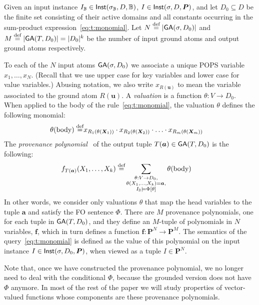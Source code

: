 
Given an input instance $I_\mathbb B \in \textsf{Inst}(\sigma_\mathbb B, D, \mathbb B)$,
$I \in \textsf{Inst}(\sigma, D, \bm P)$, and let $D_0 \subseteq D$ be the
finite set consisting of their active domains and all constants
occurring in the sum-product expression~\eqref{eq:t:monomial}.  Let
$N \stackrel{\text{def}}{=} |\textsf{GA}(\sigma, D_0)|$ and
$M \stackrel{\text{def}}{=} |\textsf{GA}(T,D_0)| = |D_0|^k$ be the number of input ground
atoms and output ground atoms respectively.

To each of the $N$ input atoms $\textsf{GA}(\sigma,D_0)$ we associate a unique POPS variable
$x_1, \ldots, x_N$. (Recall that we use upper case for key variables and
lower case for value variables.)
Abusing notation, we also write $x_{R(\bm u)}$ to mean the variable associated to the ground
atom $R(\bm u)$.
A {\em valuation} is a function $\theta : V \rightarrow D_0$.
When applied to the body of the rule~\eqref{eq:t:monomial}, the valuation $\theta$ defines the
following monomial:
%
\begin{align}
  \theta(\text{body}) \stackrel{\text{def}}{=} & x_{R_1(\theta(\bm X_1))}\cdot x_{R_2(\theta(\bm X_2))} \cdot \ldots \cdot x_{R_m(\theta(\bm X_m))} \label{eq:grounding:monomial}
\end{align}
%
The {\em provenance polynomial}~\cite{DBLP:conf/pods/GreenKT07} of the output tuple
$T(\bm a) \in \textsf{GA}(T,D_0)$ is the following:
%
\begin{align}
  f_{T(\bm a)}(X_1, \ldots, X_k) \stackrel{\text{def}}{=} &
  \sum_{\substack{\theta: V \rightarrow D_0, \\ \theta(X_1,\ldots,X_k)=\bm a, \\ I_\mathbb B \models
  \Phi[\theta]}} \theta(\text{body}) \label{eq:grounding:polynomial}
\end{align}
%
In other words, we consider only valuations $\theta$ that map the head
variables to the tuple $\bm a$ and satisfy the FO sentence $\Phi$.
There are $M$ provenance polynomials, one for each tuple in
$\textsf{GA}(T,D_0)$, and they define an $M$-tuple of polynomials in $N$
variables, $\bm f$, which in turn defines a function
$\bm f : \bm P^N \rightarrow \bm P^M$.  The semantics of the
query~\eqref{eq:t:monomial} is defined as the value of this polynomial
on the input instance $I \in \textsf{Inst}(\sigma, D_0, \bm P)$, when viewed
as a tuple $I \in \bm P^N$.

Note that, once we have constructed the provenance polynomial, we no longer need to deal with the
conditional $\Phi$, because the grounded version does not have $\Phi$ anymore.
In most of the rest of the paper we will study properties of vector-valued
functions whose components are these provenance polynomials.

